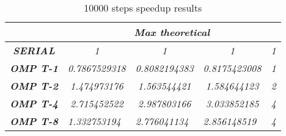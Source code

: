 \begin{table}
    \centering
    \begin{tabular}{|c|c|c|c|c|} 
    \hline
                                                    & \multicolumn{4}{c|}{\textit{\textbf{Max theoretical}}}                                                                                                               \\ 
    \hline
    \textit{\textbf{SERIAL}}                        & \textit{1}                                & \textit{1}                                & \textit{1}                                & \textit{1}                       \\ 
    \hline
    \textit{\textbf{OMP T-1}}                       & \textit{0.7867529318}                     & \textit{0.8082194383}                     & \textit{0.8175423008}                     & \textit{1}                       \\ 
    \hline
    \textit{\textbf{OMP T-2}}                       & \textit{1.474973176}                      & \textit{1.563544421}                      & \textit{1.584644123}                      & \textit{2}                       \\ 
    \hline
    \textit{\textbf{OMP T-4}}                       & \textit{2.715452522}                      & \textit{2.987803166}                      & \textit{3.033852185}                      & \textit{4}                       \\ 
    \hline
    \multicolumn{1}{|l|}{\textit{\textbf{OMP T-8}}} & \multicolumn{1}{l|}{\textit{1.332753194}} & \multicolumn{1}{l|}{\textit{2.776041134}} & \multicolumn{1}{l|}{\textit{2.856148519}} & \multicolumn{1}{l|}{\textit{4}}  \\
    \hline
    \end{tabular}
    \caption{10000 steps speedup results}
\end{table}